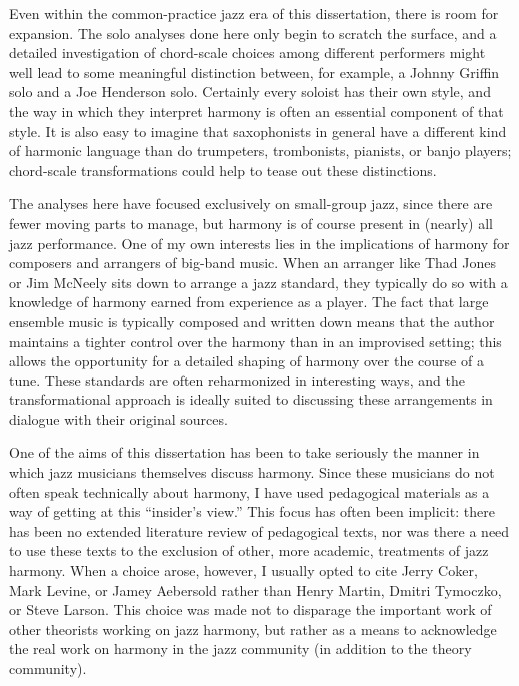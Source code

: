 Even within the common-practice jazz era of this dissertation, there is room
for expansion. The solo analyses done here only begin to scratch the surface,
and a detailed investigation of chord-scale choices among different performers
might well lead to some meaningful distinction between, for example, a Johnny
Griffin solo and a Joe Henderson solo. Certainly every soloist has their own
style, and the way in which they interpret harmony is often an essential
component of that style. It is also easy to imagine that saxophonists in
general have a different kind of harmonic language than do trumpeters,
trombonists, pianists, or banjo players; chord-scale transformations could
help to tease out these distinctions.

The analyses here have focused exclusively on small-group jazz, since there
are fewer moving parts to manage, but harmony is of course present in (nearly)
all jazz performance. One of my own interests lies in the implications of
harmony for composers and arrangers of big-band music. When an arranger like
Thad Jones or Jim McNeely sits down to arrange a jazz standard, they typically
do so with a knowledge of harmony earned from experience as a player. The fact
that large ensemble music is typically composed and written down means that
the author maintains a tighter control over the harmony than in an improvised
setting; this allows the opportunity for a detailed shaping of harmony over
the course of a tune. These standards are often reharmonized in interesting
ways, and the transformational approach is ideally suited to discussing these
arrangements in dialogue with their original sources.

One of the aims of this dissertation has been to take seriously the manner in
which jazz musicians themselves discuss harmony. Since these musicians do not
often speak technically about harmony, I have used pedagogical materials as a
way of getting at this ``insider's view.'' This focus has often been implicit:
there has been no extended literature review of pedagogical texts, nor was
there a need to use these texts to the exclusion of other, more academic,
treatments of jazz harmony. When a choice arose, however, I usually opted to
cite Jerry Coker, Mark Levine, or Jamey Aebersold rather than Henry Martin,
Dmitri Tymoczko, or Steve Larson. This choice was made not to disparage the
important work of other theorists working on jazz harmony, but rather as a
means to acknowledge the real work on harmony in the jazz community (in
addition to the theory community).

